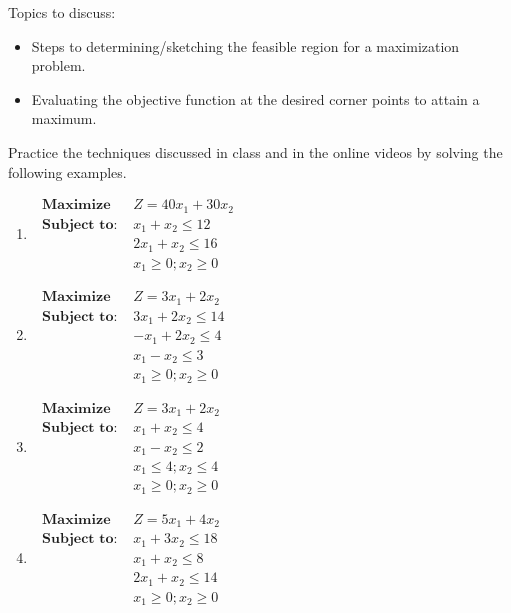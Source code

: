 \documentclass[10pt]{book}
\theoremstyle{definition}
\theoremstyle{remark}
\begin{document}
\begin{large}
\noindent
Topics to discuss:
\begin{itemize}
\item Steps to determining/sketching the feasible region for a maximization problem. 
\item Evaluating the objective function at the desired corner points to attain a maximum.
\end{itemize}
\newpage

\noindent
Practice the techniques discussed in class and in the online videos by solving the following examples. 
\begin{enumerate}
\item $\begin{array}{ll} 
\textbf { Maximize } & Z=40 x_{1}+30 x_{2} \\ 
\textbf { Subject to: } & x_{1}+x_{2} \leq 12 \\ 
& 2 x_{1}+x_{2} \leq 16 \\ 
& x_{1} \geq 0 ; x_{2} \geq 0 
\end{array}\nonumber$
\newpage

\item $\begin{array}{ll} 
\textbf { Maximize } & Z=3x_{1}+2x_{2} \\ 
\textbf { Subject to: } &3 x_{1}+2x_{2} \leq 14 \\ 
& - x_{1}+2x_{2} \leq 4 \\ 
&  x_{1}-x_{2} \leq 3\\ 
& x_{1} \geq 0 ; x_{2} \geq 0 
\end{array}\nonumber$
\newpage

\item $\begin{array}{ll} 
\textbf { Maximize } & Z=3x_{1}+2x_{2} \\ 
\textbf { Subject to: } &  x_{1}+x_{2} \leq 4 \\ 
&  x_{1}-x_{2} \leq 2\\ 
& x_{1} \leq 4 ; x_{2} \leq 4 \\ 
& x_{1} \geq 0 ; x_{2} \geq 0 
\end{array}\nonumber$
\newpage

\item $\begin{array}{ll} 
\textbf { Maximize } & Z=5x_{1}+4x_{2} \\ 
\textbf { Subject to: } &  x_{1}+3x_{2} \leq 18 \\ 
&  x_{1}+x_{2} \leq 8\\ 
&  2x_{1}+x_{2} \leq 14\\ 
& x_{1} \geq 0 ; x_{2} \geq 0 
\end{array}\nonumber$
\newpage


\end{enumerate}
\end{large}
\end{document}
